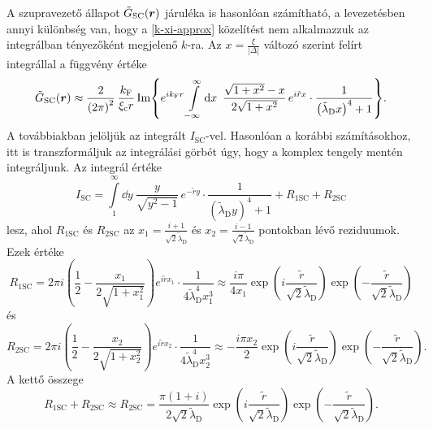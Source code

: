 \documentclass[a4paper,12pt,titlepage]{article}
\newcommand{\RR}{{\vb*{r}}}
\newcommand{\kF}{{k_\text{F}}}
\begin{document}
A szupravezető állapot $\tilde{G}_\text{SC}(\RR)$ járuléka is hasonlóan számítható, a levezetésben annyi különbség van, hogy a \eqref{k-xi-approx} közelítést nem alkalmazzuk az integrálban tényezőként megjelenő $k$-ra.  Az $x = \frac{\xi}{\left| \Delta \right|}$ változó szerint felírt integrállal a függvény értéke
\begin{equation}
	\tilde{G}_\text{SC}(\RR) \approx \frac{2}{\left( 2 \pi \right)^2} \, \frac{\kF}{\xi_\text{c} r} \Im{ e^{i \kF r} \int\limits_{-\infty}^\infty \dd{x} ~ \frac{\sqrt{1 + x^2} - x}{2 \sqrt{1 + x^2}} \, e^{i \tilde{r} x} \cdot \frac{1}{\left( \tilde{\lambda}_\text{D} x \right)^4 + 1} }.
\end{equation}
A továbbiakban jelöljük az integrált $I_\text{SC}$-vel.  Hasonlóan a korábbi számításokhoz, itt is transzformáljuk az integrálási görbét úgy, hogy a komplex tengely mentén integráljunk.  Az integrál értéke
\begin{equation}
	I_\text{SC} = \int\limits_1^\infty \dd{y} ~ \frac{y}{\sqrt{y^2 - 1}} \, e^{-\tilde{r} y} \cdot \frac{1}{\left( \tilde{\lambda}_\text{D} y \right)^4 + 1} + R_{1 \text{SC}} + R_{2 \text{SC}}
\end{equation}
lesz, ahol $R_{1 \text{SC}}$ és $R_{2 \text{SC}}$ az $x_1 = \frac{i + 1}{\sqrt{2} \tilde{\lambda}_\text{D}}$ és $x_2 = \frac{i - 1}{\sqrt{2} \tilde{\lambda}_\text{D}}$ pontokban lévő reziduumok.  Ezek értéke
\begin{equation}
	R_{1 \text{SC}} = 2 \pi i \left( \frac{1}{2} - \frac{x_1}{2 \sqrt{1 + x_1^2}} \right) e^{i \tilde{r} x_1} \cdot \frac{1}{4 \tilde{\lambda}_\text{D}^4 x_1^3} \approx \frac{i \pi}{4 x_1} \exp(i \frac{\tilde{r}}{\sqrt{2} \tilde{\lambda}_\text{D}}) \exp(-\frac{\tilde{r}}{\sqrt{2} \tilde{\lambda}_\text{D}})
\end{equation}
és
\begin{equation}
	R_{2 \text{SC}} = 2 \pi i \left( \frac{1}{2} - \frac{x_2}{2 \sqrt{1 + x_2^2}} \right) e^{i \tilde{r} x_2} \cdot \frac{1}{4 \tilde{\lambda}_\text{D}^4 x_2^3} \approx -\frac{i \pi x_2}{2} \exp(i \frac{\tilde{r}}{\sqrt{2} \tilde{\lambda}_\text{D}}) \exp(-\frac{\tilde{r}}{\sqrt{2} \tilde{\lambda}_\text{D}}).
\end{equation}
A kettő összege
\begin{equation}
	R_{1 \text{SC}} + R_{2 \text{SC}} \approx R_{2 \text{SC}} = \frac{\pi \left( 1 + i \right)}{2 \sqrt{2} \tilde{\lambda}_\text{D}} \exp(i \frac{\tilde{r}}{\sqrt{2} \tilde{\lambda}_\text{D}}) \exp(-\frac{\tilde{r}}{\sqrt{2} \tilde{\lambda}_\text{D}}).
\end{equation}
\end{document}
